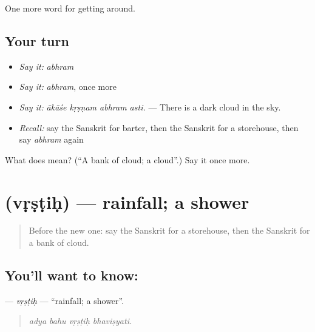 \begin{grammarlens}[title={What you've built}]
One more word for getting around.
\end{grammarlens}

\subsection*{Your turn}
\begin{itemize}
\raggedright
  \item \emph{Say it:} \emph{abhram}
  \item \emph{Say it:} \emph{abhram}, once more
  \item \emph{Say it:} \emph{ākāśe kṛṣṇam abhram asti.} — There is a dark cloud in the sky.
  \item \emph{Recall:} say the Sanskrit for barter, then the Sanskrit for a storehouse, then say \emph{abhram} again
\end{itemize}

\begin{tcolorbox}[breakable,colback=teal!4,colframe=teal!35!black,title={Before you move on}]
What does  mean? (\textquotedblleft{}A bank of cloud; a cloud\textquotedblright{}.) Say it once more.
\end{tcolorbox}
\section[\texorpdfstring{\sk{वृष्टिः} (vṛṣṭiḥ)}{वृष्टिः (vṛṣṭiḥ)}]{ (vṛṣṭiḥ) — rainfall; a shower}

\label{lesson:SA-C436-vrstih}



\begin{quote}
Before the new one: say the Sanskrit for a storehouse, then the Sanskrit for a bank of cloud.
\end{quote}

\subsection*{You'll want to know: }
\textbf{} — \emph{vṛṣṭiḥ} — \textquotedblleft{}rainfall; a shower\textquotedblright{}.

\begin{quote}
   
\end{quote}

\begin{quote}
\emph{adya bahu vṛṣṭiḥ bhaviṣyati.}
\end{quote}

